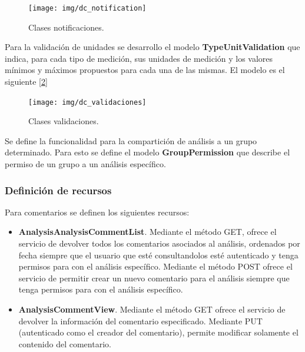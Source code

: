 	\begin{figure}[h]
        \centering
        \texttt{[image: img/dc\_notification]}
        \caption{Clases notificaciones.}
		\label{9-notificaciones}
    \end{figure}

Para la validación de unidades se desarrollo el modelo \textbf{TypeUnitValidation} que indica, para cada tipo de medición, sus unidades de medición y los valores mínimos y máximos propuestos para cada una de las mismas. El modelo es el siguiente [\ref{9-validaciones}]

	\begin{figure}[h]
        \centering
        \texttt{[image: img/dc\_validaciones]}
        \caption{Clases validaciones.}
		\label{9-validaciones}
    \end{figure}

Se define la funcionalidad para la compartición de análisis a un grupo determinado. Para esto se define el modelo \textbf{GroupPermission} que describe el permiso de un grupo a un análisis específico.

\subsubsection{Definición de recursos}

Para comentarios se definen los siguientes recursos:
\begin{itemize}
	\item \textbf{AnalysisAnalysisCommentList}. Mediante el método GET, ofrece el servicio de devolver todos los comentarios asociados al análisis, ordenados por fecha  siempre que el usuario que esté consultandolos esté autenticado y tenga permisos para con el análisis específico. Mediante el método POST ofrece el servicio de permitir crear un nuevo comentario para el análisis siempre que tenga permisos para con el análisis específico.
	\item \textbf{AnalysisCommentView}. Mediante el método GET ofrece el servicio de devolver la información del comentario especificado. Mediante PUT (autenticado como el creador del comentario), permite modificar solamente el contenido del comentario.
\end{itemize}

